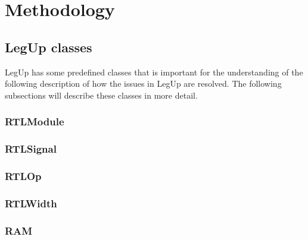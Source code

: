\chapter{Methodology}

\section{LegUp classes}
LegUp has some predefined classes that is important for the understanding of the following description of how the issues in LegUp are resolved. The following subsections will describe these classes in more detail.
\subsection{RTLModule}

\subsection{RTLSignal}

\subsection{RTLOp}

\subsection{RTLWidth}

\subsection{RAM}



